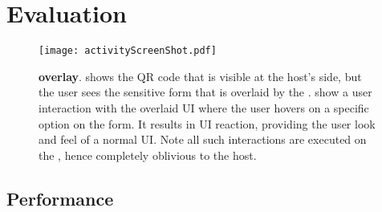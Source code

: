 \section{Evaluation}
\label{sec:eval}

\iffalse
\begin{figure}[t]
\centering
\texttt{[image: overlayScreenShot.pdf]}
\caption{\textbf{\name overlay}. }
\label{fig:screenshot_1}
\centering
\end{figure}
\fi



\begin{figure}[t]
\centering
\texttt{[image: activityScreenShot.pdf]}
\caption{\textbf{\name overlay}. \one shows the QR code that is visible at the host's side, but the user sees the sensitive form that is overlaid by the \device. \two show a user interaction with the overlaid UI where the user hovers on a specific option on the form. It results in UI reaction, providing the user look and feel of a normal UI. Note all such interactions are executed on the \device, hence completely oblivious to the host.}
\label{fig:screenshot_2}
\centering
\end{figure}


\subsection{Performance}